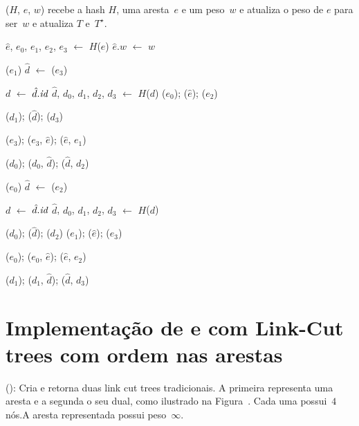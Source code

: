 \MSFupdate($H$, $e$, $w$) recebe a hash $H$, uma aresta~$e$ e um peso~$w$ e atualiza o peso de $e$ para ser~$w$ e atualiza $T$ e~$T^\star$.

\begin{algorithm}[htb]
\caption{\MSFupdate($H$, $e$, $w$)}
\label{Algo:MSFupdate}
\begin{algorithmic}[1]
\State $\hat e$, $e_0$, $e_1$, $e_2$, $e_3$ $\gets$ $H$($e$)
\State $\hat e.w$ $\gets$ $w$
\label{Algo:MSFupdate:linhauvinF}

\State \linkcutEvert($e_1$)
\State $\hat d$ $\gets$ \linkcutMin($e_3$)

\State \Return
\EndIf
\State $d$ $\gets$ $\hat d.\textit{id}$
\State $\hat d$, $d_0$, $d_1$, $d_2$, $d_3$ $\gets$ $H$($d$)
\State \linkcutEvert($e_0$); \linkcutDelEdge($\hat e$); \linkcutDelEdge($e_2$)

\State \linkcutEvert($d_1$); \linkcutDelEdge($\hat d$); \linkcutDelEdge($d_3$)

\State \linkcutEvert($e_3$); \linkcutAddEdge($e_3$, $\hat e$); \linkcutAddEdge($\hat e$, $e_1$)

\State \linkcutEvert($d_0$); \linkcutAddEdge($d_0$, $\hat d$); \linkcutAddEdge($\hat d$, $d_2$)
\EndIf

\Else

\State \linkcutEvert($e_0$)
\State $\hat d$ $\gets$ \linkcutMax($e_2$)

\State \Return
\EndIf
\State $d$ $\gets$ $\hat d.\textit{id}$
\State $\hat d$, $d_0$, $d_1$, $d_2$, $d_3$ $\gets$ $H$($d$)

\State \linkcutEvert($d_0$); \linkcutDelEdge($\hat d$); \linkcutDelEdge($d_2$)
\State \linkcutEvert($e_1$); \linkcutDelEdge($\hat e$); \linkcutDelEdge($e_3$)

\State \linkcutEvert($e_0$); \linkcutAddEdge($e_0$, $\hat e$); \linkcutAddEdge($\hat e$, $e_2$)

\State \linkcutEvert($d_1$); \linkcutAddEdge($d_1$, $\hat d$); \linkcutAddEdge($\hat d$, $d_3$)

\EndIf
\EndIf
\end{algorithmic}
\end{algorithm}

\section{Implementação de \LCOSplice{} e \LCOMakeEdge{} com Link-Cut trees com ordem nas arestas}
\LCOMakeEdge(): Cria e retorna duas link cut trees tradicionais. A primeira representa uma aresta e a segunda o seu dual, como ilustrado na Figura~. Cada uma possui~$4$ nós.A aresta representada possui peso~$\infty$.


